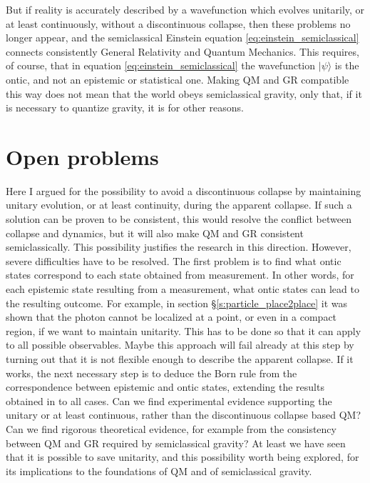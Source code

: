 \documentclass[11pt]{amsart}
\theoremstyle{definition}
\theoremstyle{plain}
\begin{document}
But if reality is accurately described by a wavefunction which evolves unitarily, or at least continuously, without a discontinuous collapse, then these problems no longer appear, and the semiclassical Einstein equation \eqref{eq:einstein_semiclassical} connects consistently General Relativity and Quantum Mechanics. 
This requires, of course, that in equation \eqref{eq:einstein_semiclassical} the wavefunction $|{\psi}\rangle$ is the ontic, and not an epistemic or statistical one.
Making QM and GR compatible this way does not mean that the world obeys semiclassical gravity, only that, if it is necessary to quantize gravity, it is for other reasons.


\section{Open problems}
\label{s:open}

Here I argued for the possibility to avoid a discontinuous collapse by maintaining unitary evolution, or at least continuity, during the apparent collapse. If such a solution can be proven to be consistent, this would resolve the conflict between collapse and dynamics, but it will also make QM and GR consistent semiclassically. This possibility justifies the research in this direction. However, severe difficulties have to be resolved. The first problem is to find what ontic states correspond to each state obtained from measurement. In other words, for each epistemic state resulting from a measurement, what ontic states can lead to the resulting outcome. For example, in section \S\ref{s:particle_place2place} it was shown that the photon cannot be localized at a point, or even in a compact region, if we want to maintain unitarity. This has to be done so that it can apply to all possible observables.  Maybe this approach will fail already at this step by turning out that it is not flexible enough to describe the apparent collapse. If it works, the next necessary step is to deduce the Born rule from the correspondence between epistemic and ontic states, extending the results obtained in \cite{shaarawi1994diffraction} to all cases. 
Can we find experimental evidence supporting the unitary or at least continuous, rather than the discontinuous collapse based QM?
Can we find rigorous theoretical evidence, for example from the consistency between QM and GR required by semiclassical gravity?
At least we have seen that it is possible to save unitarity, and this possibility worth being explored, for its implications to the foundations of QM and of semiclassical gravity.
\end{document}
